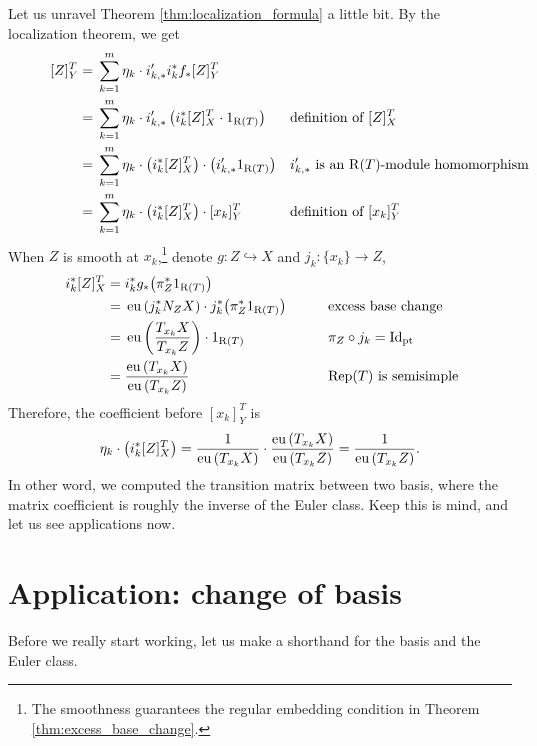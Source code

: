 Let us unravel Theorem \ref{thm:localization_formula} a little bit. By the localization theorem, we get
\begin{equation*}
\begin{aligned}\
   [Z]_Y^T=\;& \sum_{k=1}^{m} \eta_k \cdot i'_{k,*}i_{k}^* f_{*} [Z]_Y^T&& \\
   =\;& \sum_{k=1}^{m} \eta_k \cdot i'_{k,*}\left(i_{k}^* [Z]_X^T \cdot 1_{\Rpt(T)}\right) && \text{definition of $[Z]_X^T$}\\
   =\;& \sum_{k=1}^{m} \eta_k \cdot \left(i_{k}^* [Z]_X^T\right) \cdot\left( i'_{k,*} 1_{\Rpt(T)}\right) && \text{$i'_{k,*}$ is an $\Rpt(T)$-module homomorphism}\hspace{-14mm}\\
   =\;& \sum_{k=1}^{m} \eta_k \cdot \left(i_{k}^* [Z]_X^T\right) \cdot[x_k]_Y^T && \text{definition of $[x_k]_Y^T$}\\
\end{aligned}
\end{equation*}
When $Z$ is smooth at $x_k$,\footnote{The smoothness guarantees the regular embedding condition in Theorem \ref{thm:excess_base_change}.} denote $g: Z \hookrightarrow X$ and $j_k: \{x_k\} \longrightarrow Z$, 
\begin{equation*}
\begin{aligned}\
   i_{k}^* [Z]_X^T=\;& i_{k}^* g_* \big(  \pi_Z^* 1_{\operatorname{\operatorname{R}}(T)} \big) &&\\
   =\;& \operatorname{\operatorname{eu}} \left( j_k^* N_Z X  \right) \cdot j_k^* \big(  \pi_Z^* 1_{\operatorname{\operatorname{R}}(T)} \big) \qquad&& \text{excess base change}\\
   =\;& \operatorname{\operatorname{eu}} \left( \frac{T_{x_k}X}{T_{x_k}Z}  \right) \cdot  1_{\operatorname{\operatorname{R}}(T)}&& \pi_Z \circ j_k = \operatorname{\operatorname{Id}}_{\operatorname{\operatorname{pt}}} \\
   =\;& \frac{\operatorname{\operatorname{eu}} \left(T_{x_k}X\right)}{\operatorname{\operatorname{eu}} \left(T_{x_k}Z\right)} && \text{$\operatorname{\operatorname{Rep}}(T)$ is semisimple} \\
\end{aligned}
\end{equation*}
Therefore, the coefficient before $[x_k]_Y^T$ is 
$$\eta_k \cdot \left(i_{k}^* [Z]_X^T\right) = \frac{1}{\operatorname{\operatorname{eu}} \left(T_{x_k}X\right)}\cdot\frac{\operatorname{\operatorname{eu}} \left(T_{x_k}X\right)}{\operatorname{\operatorname{eu}} \left(T_{x_k}Z\right)}=\frac{1}{\operatorname{\operatorname{eu}} \left(T_{x_k}Z\right)}.$$
In other word, we computed the transition matrix between two basis, where the matrix coefficient is roughly the inverse of the Euler class. Keep this is mind, and let us see applications now.

\section{Application: change of basis}
Before we really start working, let us make a shorthand for the basis and the Euler class.

